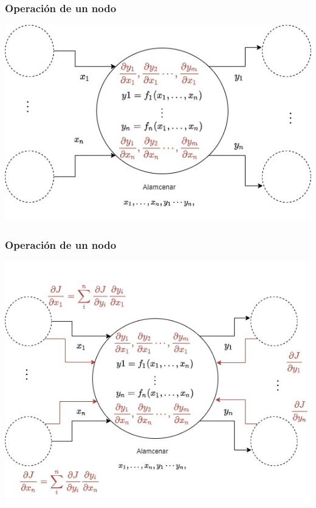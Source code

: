 \documentclass{beamer}
\begin{document}
\begin{frame}
\frametitle{Operación de un nodo}
\includegraphics[scale=0.4]{im15}
\end{frame}
\begin{frame}
\frametitle{Operación de un nodo}
\includegraphics[scale=0.4]{im16}
\end{frame}
\end{document}
